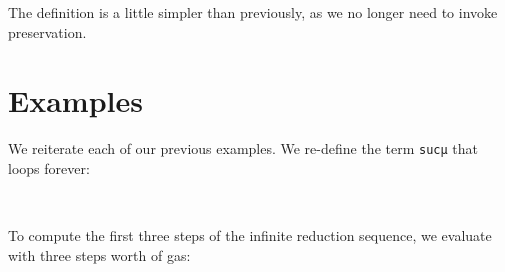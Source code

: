 The definition is a little simpler than previously, as we no longer need
to invoke preservation.

\hypertarget{examples-1}{%
\section{Examples}\label{examples-1}}

We reiterate each of our previous examples. We re-define the term
\texttt{sucμ} that loops forever:

\begin{fence}
\begin{code}%
\>[0]\AgdaSpace{}%
\AgdaSymbol{:}\AgdaSpace{}%
\AgdaSpace{}%
\AgdaSpace{}%
\<%
\\
\>[0]\AgdaSpace{}%
\AgdaSymbol{=}\AgdaSpace{}%
\AgdaSpace{}%
\AgdaSymbol{(}\AgdaSpace{}%
\AgdaSymbol{(}\AgdaOperator{\AgdaFunction{\#}}\AgdaSpace{}%
\AgdaSymbol{))}\<%
\end{code}
\end{fence}

To compute the first three steps of the infinite reduction sequence, we
evaluate with three steps worth of gas:


